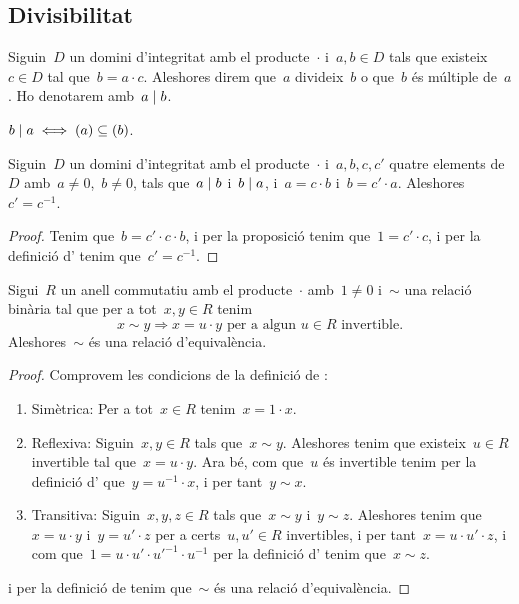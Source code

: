 \documentclass[../../main.tex]{subfiles}
\begin{document}
	\subsection{Divisibilitat}
	\begin{definition}
		\label{def:divisor per anells}
		\label{def:múltiple per anells}
		Siguin~\(D\) un domini d'integritat amb el producte~\(\cdot\) i~\(a,b\in D\) tals que existeix~\(c\in D\) tal que~\(b=a\cdot c\).
		Aleshores direm que~\(a\) divideix~\(b\) o que~\(b\) és múltiple de~\(a\).
		Ho denotarem amb~\(a\mathrel{|} b\).
	\end{definition}
	\begin{observation}
		\label{obs:divisors són ideals continguts}
		\(b\mathrel{|} a\iff(a)\subseteq(b)\).
	\end{observation}
	\begin{proposition}
		\label{prop:podem passar els múltiples de costat a costat}
		Siguin~\(D\) un domini d'integritat amb el producte~\(\cdot\) i~\(a,b,c,c'\) quatre elements de~\(D\) amb~\(a\neq0\),~\(b\neq0\), tals que~\(a\mathrel{|} b\) i~\(b\mathrel{|} a\), i~\(a=c\cdot b\) i~\(b=c'\cdot a\).
		Aleshores~\(c'=c^{-1}\).
		\begin{proof}
			Tenim que~\(b=c'\cdot c\cdot b\), i per la proposició  tenim que~\(1=c'\cdot c\), i per la definició d' tenim que~\(c'=c^{-1}\).
		\end{proof}
	\end{proposition}
	\begin{proposition}
		\label{prop:associats és relació d'equivalència}
		Sigui~\(R\) un anell commutatiu amb el producte~\(\cdot\) amb~\(1\neq0\) i~\(\sim\) una relació binària tal que per a tot~\(x,y\in R\) tenim
		\[
		    x\sim y\Longrightarrow x=u\cdot y\text{ per a algun }u\in R\text{ invertible}.
		\]
		Aleshores~\(\sim\) és una relació d'equivalència.
		\begin{proof}
			Comprovem les condicions de la definició de \myref{def:relació d'equivalència}:
			\begin{enumerate}
				\item Simètrica: Per a tot~\(x\in R\) tenim~\(x=1\cdot x\).
				\item Reflexiva: Siguin~\(x,y\in R\) tals que~\(x\sim y\).
				Aleshores tenim que existeix~\(u\in R\) invertible tal que~\(x=u\cdot y\).
				Ara bé, com que~\(u\) és invertible tenim per la definició d' que~\(y=u^{-1}\cdot x\), i per tant~\(y\sim x\).
				\item Transitiva: Siguin~\(x,y,z\in R\) tals que~\(x\sim y\) i~\(y\sim z\).
				Aleshores tenim que~\(x=u\cdot y\) i~\(y=u'\cdot z\) per a certs~\(u,u'\in R\) invertibles, i per tant~\(x=u\cdot u'\cdot z\), i com que~\(1=u\cdot u'\cdot {u'}^{-1}\cdot{u}^{-1}\) per la definició d' tenim que~\(x\sim z\).
			\end{enumerate}
			i per la definició de  tenim que~\(\sim\) és una relació d'equivalència.
		\end{proof}
	\end{proposition}
\end{document}
